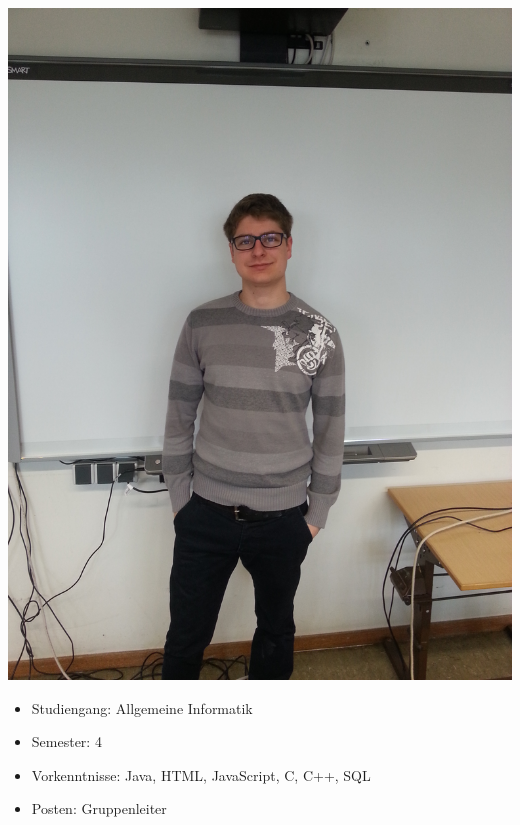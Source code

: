 \begin{minipage}{0.28\textwidth} 
\includegraphics[width=\textwidth]{content/pictures/Chris.jpg}
\end{minipage}%
\begin{minipage}{0.7\textwidth}
\begin{itemize}
  \item Studiengang: Allgemeine Informatik
  \item Semester: 4
  \item Vorkenntnisse: Java, HTML, JavaScript, C, C++, SQL
  \item Posten: Gruppenleiter
\end{itemize}
\end{minipage}

